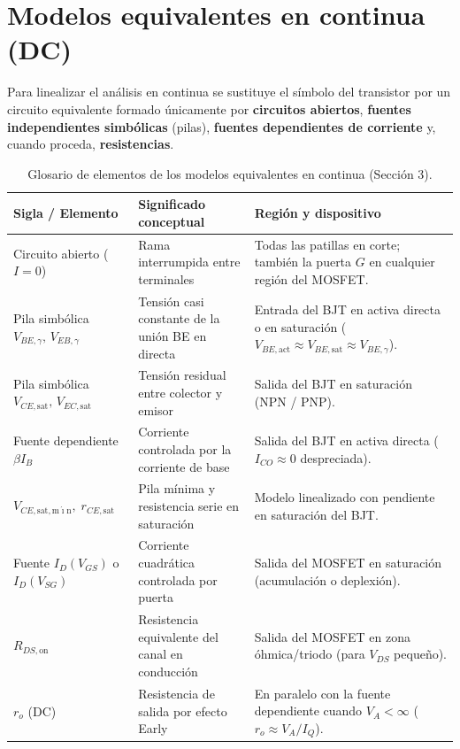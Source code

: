 \documentclass[11pt,a4paper]{article}
\begin{document}
	\section{Modelos equivalentes en continua (DC)}

	Para linealizar el análisis en continua se sustituye el símbolo del transistor por un circuito equivalente formado únicamente por \textbf{circuitos abiertos}, \textbf{fuentes independientes simbólicas} (pilas), \textbf{fuentes dependientes de corriente} y, cuando proceda, \textbf{resistencias}.

	\begin{table}[H]
		\centering
		\footnotesize
		\begin{tabularx}{\textwidth}{@{}>{\raggedright\arraybackslash}p{3.4cm} >{\raggedright\arraybackslash}p{4.6cm} >{\raggedright\arraybackslash}X@{}}
			\toprule
			\rowcolor{mainblue!15}
			\textbf{Sigla / Elemento} & \textbf{Significado conceptual} & \textbf{Región y dispositivo} \\
			\midrule
			Circuito abierto ($I = 0$) & Rama interrumpida entre terminales & Todas las patillas en corte; también la puerta $G$ en cualquier región del MOSFET. \\
			Pila simbólica $V_{BE,\gamma},\, V_{EB,\gamma}$ & Tensión casi constante de la unión BE en directa & Entrada del BJT en activa directa o en saturación ($V_{BE,\mathrm{act}} \approx V_{BE,\mathrm{sat}} \approx V_{BE,\gamma}$). \\
			Pila simbólica $V_{CE,\mathrm{sat}},\, V_{EC,\mathrm{sat}}$ & Tensión residual entre colector y emisor & Salida del BJT en saturación (NPN / PNP). \\
			Fuente dependiente $\beta I_B$ & Corriente controlada por la corriente de base & Salida del BJT en activa directa ($I_{CO} \approx 0$ despreciada). \\
			$V_{CE,\mathrm{sat,m\acute{\imath}n}},\; r_{CE,\mathrm{sat}}$ & Pila mínima y resistencia serie en saturación & Modelo linealizado con pendiente en saturación del BJT. \\
			Fuente $I_D(V_{GS})$ o $I_D(V_{SG})$ & Corriente cuadrática controlada por puerta & Salida del MOSFET en saturación (acumulación o deplexión). \\
			$R_{DS,\mathrm{on}}$ & Resistencia equivalente del canal en conducción & Salida del MOSFET en zona óhmica/triodo (para $V_{DS}$ pequeño). \\
			$r_o$ (DC) & Resistencia de salida por efecto Early & En paralelo con la fuente dependiente cuando $V_A < \infty$ ($r_o \approx V_A / I_Q$). \\
			\bottomrule
		\end{tabularx}
		\caption{Glosario de elementos de los modelos equivalentes en continua (Sección 3).}
	\end{table}
\end{document}
